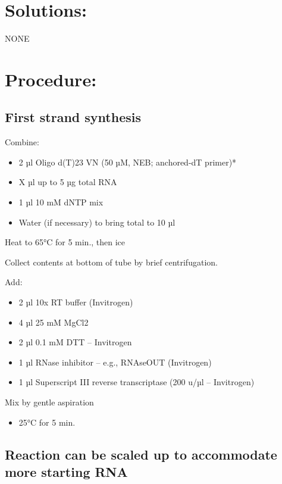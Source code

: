 \documentclass[
  letterpaper,
  DIV=11,
  numbers=noendperiod]{scrreprt}
\providecommand{\tightlist}{%
  \setlength{\itemsep}{0pt}\setlength{\parskip}{0pt}}\usepackage{longtable,booktabs,array}
\begin{document}
\hypertarget{solutions-10}{%
\section{Solutions:}\label{solutions-10}}

NONE

\hypertarget{procedure-10}{%
\section{Procedure:}\label{procedure-10}}

\hypertarget{first-strand-synthesis}{%
\subsection{First strand synthesis}\label{first-strand-synthesis}}

Combine:

\begin{itemize}
\tightlist
\item
  2 µl Oligo d(T)23 VN (50 µM, NEB; anchored-dT primer)*
\item
  X µl up to 5 µg total RNA
\item
  1 µl 10 mM dNTP mix
\item
  Water (if necessary) to bring total to 10 µl
\end{itemize}

Heat to 65°C for 5 min., then ice

Collect contents at bottom of tube by brief centrifugation.

Add:

\begin{itemize}
\tightlist
\item
  2 µl 10x RT buffer (Invitrogen)
\item
  4 µl 25 mM MgCl2
\item
  2 µl 0.1 mM DTT -- Invitrogen
\item
  1 µl RNase inhibitor -- e.g., RNAseOUT (Invitrogen)
\item
  1 µl Superscript III reverse transcriptase (200 u/µl -- Invitrogen)
\end{itemize}

Mix by gentle aspiration

\begin{itemize}
\tightlist
\item
  25°C for 5 min.
\end{itemize}

\hypertarget{reaction-can-be-scaled-up-to-accommodate-more-starting-rna}{%
\subsection{Reaction can be scaled up to accommodate more starting
RNA}\label{reaction-can-be-scaled-up-to-accommodate-more-starting-rna}}
\end{document}
